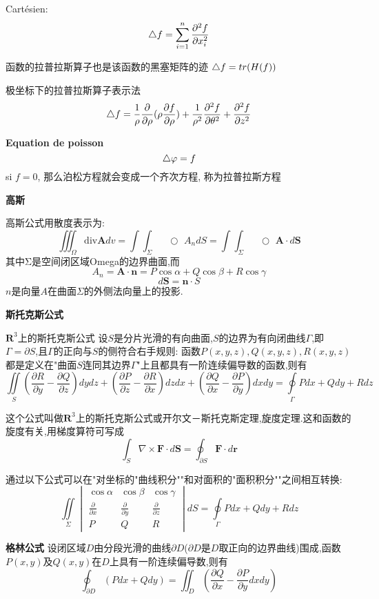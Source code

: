 \documentclass{book}
\begin{document}
Cart\'esien: $$\mathop{}\!\mathbin\bigtriangleup f = \sum_{i=1}^n \frac{\partial^2 f }{\partial x_i^2} $$

函数的拉普拉斯算子也是该函数的黑塞矩阵的迹 $\mathop{}\!\mathbin\bigtriangleup f = tr(H(f))$

极坐标下的拉普拉斯算子表示法
$$
\mathop{}\!\mathbin\bigtriangleup f
= \frac{1}{\rho}\frac{\partial}{\partial \rho}(\rho \frac{\partial f}{\partial \rho})
+ \frac{1}{\rho^2}\frac{\partial ^2 f}{\partial\theta^2}
+ \frac{\partial^2 f}{\partial z^2}
$$
\bigskip

\textbf{Equation de poisson}
$$\mathop{}\!\mathbin\bigtriangleup \varphi = f$$
si $f=0$, 那么泊松方程就会变成一个齐次方程, 称为拉普拉斯方程

\bigskip
\textbf{高斯}

高斯公式用散度表示为:
$$
\iiint_{\Omega}\mathrm{div}\mathbf{A}dv=
\int\!\!\!\!\int_{\Sigma}\!\!\!\!\!\!\!\!\!\!\!\!\!\!\;\;\;\bigcirc\,\,A_{n}dS
=
\int\!\!\!\!\int_{\Sigma}\!\!\!\!\!\!\!\!\!\!\!\!\!\!\;\;\;\bigcirc\,\,\mathbf{A}\cdot d\mathbf{S}
$$
其中Σ是空间闭区域Omega的边界曲面,而
$$ A_n=\mathbf{A}\cdot\mathbf{n}=P\cos\alpha+Q\cos\beta+R\cos\gamma $$
$$ d\mathbf{S}=\mathbf{n}\cdot S $$
$n$是向量$A$在曲面$\Sigma$的外侧法向量上的投影.

\bigskip
\textbf{斯托克斯公式}

$\mathbf{R}^3$上的斯托克斯公式
设$S$是分片光滑的有向曲面,$S$的边界为有向闭曲线$Γ$,即$\Gamma=\partial S$,且$Γ$的正向与$S$的侧符合右手规则:
函数$P(x,y,z),Q(x,y,z),R(x,y,z)$都是定义在"曲面$S$连同其边界$Γ$"上且都具有一阶连续偏导数的函数,则有
$$
\iint\limits_{S}(\frac{\partial R}{\partial y}-\frac{\partial Q}{\partial z})dydz
+ (\frac{\partial P}{\partial z}-\frac{\partial R}{\partial x})dzdx
+ (\frac{\partial Q}{\partial x}-\frac{\partial P}{\partial y})dxdy
= \oint\limits_{\Gamma}Pdx+Qdy+Rdz
$$

这个公式叫做$\mathbf{R}^3$上的斯托克斯公式或开尔文－斯托克斯定理,旋度定理.这和函数的旋度有关,用梯度算符可写成
$$ \int_{S} \nabla \times \mathbf{F} \cdot d\mathbf{S} = \oint_{\partial S} \mathbf{F} \cdot d \mathbf{r} $$

通过以下公式可以在"对坐标的"曲线积分""和对面积的"面积积分""之间相互转换:
$$
\iint\limits_{\Sigma}\begin{vmatrix} \cos \alpha & \cos \beta & \cos \gamma \\ \frac{\partial}{\partial x} & \frac{\partial}{\partial y} & \frac{\partial}{\partial z} \\ P & Q & R \end{vmatrix}dS=\oint\limits_{\Gamma}Pdx+Qdy+Rdz
$$

\bigskip
\textbf{格林公式}
设闭区域$D$由分段光滑的曲线$\partial D$($\partial D$是$D$取正向的边界曲线)围成,函数$P(x,y)$及$Q(x,y)$在$D$上具有一阶连续偏导数,则有
$$\oint_{\partial D} (Pdx+Qdy) = \iint_D (\frac{\partial Q}{\partial x} - \frac{\partial  P}{\partial y}dxdy)$$
\end{document}
